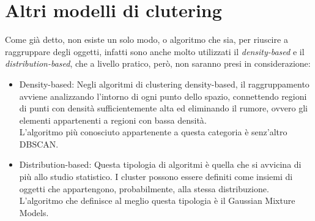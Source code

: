 \section{Altri modelli di clutering}
	Come già detto, non esiste un solo modo, o algoritmo che sia, per riuscire a raggruppare degli oggetti, infatti sono anche molto utilizzati il \emph{density-based} e il \emph{distribution-based}, che a livello pratico, però, non saranno presi in considerazione:

	\begin{itemize}
		\item Density-based:
			Negli algoritmi di clustering density-based, il raggruppamento avviene analizzando l'intorno di ogni punto dello spazio, connettendo regioni di punti con densità sufficientemente alta ed eliminando il rumore, ovvero gli elementi appartenenti a regioni con bassa densità\cite{Density_based_clustering}.\\
			L'algoritmo più conosciuto appartenente a questa categoria è senz'altro DBSCAN.
		
		\item Distribution-based:
			Questa tipologia di algoritmi è quella che si avvicina di più allo studio statistico. I cluster possono essere definiti come insiemi di oggetti che appartengono, probabilmente, alla stessa distribuzione\cite{distribution-based_clustering}. \\
			L'algoritmo che definisce al meglio questa tipologia è il Gaussian Mixture Models.
	\end{itemize}
